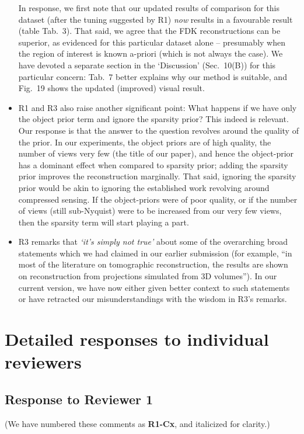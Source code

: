 \documentclass{article}
\begin{document}
\begin{itemize}
In response, we first note that our updated results of comparison for this dataset (after the tuning suggested by R1) \textit{now} results in a favourable result (table Tab.~3).  That said, we agree that the FDK reconstructions can be superior, as evidenced for this particular dataset alone -- presumably when the region of interest is known a-priori (which is not always the case). We have devoted a separate section in the `Discussion' (Sec.~10(B)) for this particular concern: Tab.~7 better explains why our method is suitable, and Fig.~19 shows the updated (improved) visual result.  
\item R1 and R3 also raise another significant point:  What happens if we have only the object prior term and ignore the sparsity prior? This indeed is relevant. Our response is that the answer to the question revolves around the quality of the prior. In our experiments, the object priors are of high quality, the number of views very few (the title of our paper), and hence the object-prior has a dominant effect when compared to sparsity prior;  adding the sparsity prior improves the reconstruction marginally.  That said, ignoring the sparsity prior would be akin to ignoring the established work revolving around compressed sensing.  If the object-priors were of poor quality, or if the number of views (still sub-Nyquist) were to be increased from our very few views, then the sparsity term will start playing a part.  
\item R3 remarks that \textit{`it's simply not true'} about some of the overarching broad statements which we had claimed in our earlier submission (for example, ``in most of the literature on tomographic reconstruction, the results are shown on reconstruction from projections simulated from 3D volumes''). In our current version, we have now either given better context to such statements or have retracted our misunderstandings with the wisdom in R3's remarks.
\end{itemize}

\section{ Detailed responses to individual reviewers}

\subsection{Response to Reviewer 1}
(We have numbered these comments as \textbf{R1-Cx}, and italicized for clarity.)\\
\end{document}
